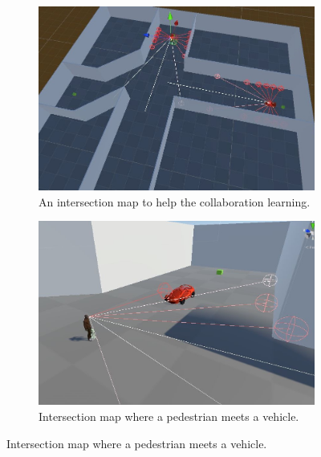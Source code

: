 \begin{figure}[!htbp] 
\centering
\begin{minipage}[t]{.45\textwidth}
\centering
\begin{subfigure}{\textwidth}
        \includegraphics[width=\linewidth, left]{06_Implementation/00_MLAgents/Images/MLMap3.JPG}
        \caption{An intersection map to help the collaboration learning. }
        \label{06:fig:MLMap3}
    \end{subfigure}
\end{minipage}
\qquad
\begin{minipage}[t]{.45\textwidth}
    \centering
    \begin{subfigure}{\textwidth}
        \includegraphics[width=\linewidth, right]{06_Implementation/00_MLAgents/Images/MLMap4.JPG}
        \caption{Intersection map where a pedestrian meets a vehicle.}
        \label{06:fig:MLMap4}
    \end{subfigure}
\end{minipage}
\end{figure}


